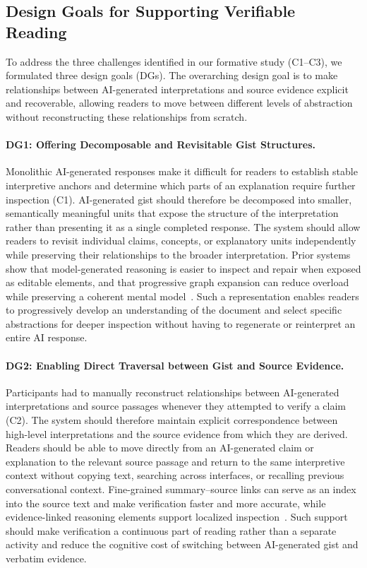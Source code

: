 \documentclass[manuscript,review,anonymous]{acmart}
\begin{document}
\subsection{Design Goals for Supporting Verifiable Reading}
\label{sec:formative-implications}

To address the three challenges identified in our formative study (C1--C3), we formulated three design goals (DGs). The overarching design goal is to make relationships between AI-generated interpretations and source evidence explicit and recoverable, allowing readers to move between different levels of abstraction without reconstructing these relationships from scratch.

\paragraph{\textbf{DG1: Offering Decomposable and Revisitable Gist Structures.}}
Monolithic AI-generated responses make it difficult for readers to establish stable interpretive anchors and determine which parts of an explanation require further inspection (C1). AI-generated gist should therefore be decomposed into smaller, semantically meaningful units that expose the structure of the interpretation rather than presenting it as a single completed response. The system should allow readers to revisit individual claims, concepts, or explanatory units independently while preserving their relationships to the broader interpretation. Prior systems show that model-generated reasoning is easier to inspect and repair when exposed as editable elements, and that progressive graph expansion can reduce overload while preserving a coherent mental model~\cite{criticality,mindtrellis}. Such a representation enables readers to progressively develop an understanding of the document and select specific abstractions for deeper inspection without having to regenerate or reinterpret an entire AI response.

\paragraph{\textbf{DG2: Enabling Direct Traversal between Gist and Source Evidence.}}
Participants had to manually reconstruct relationships between AI-generated interpretations and source passages whenever they attempted to verify a claim (C2). The system should therefore maintain explicit correspondence between high-level interpretations and the source evidence from which they are derived. Readers should be able to move directly from an AI-generated claim or explanation to the relevant source passage and return to the same interpretive context without copying text, searching across interfaces, or recalling previous conversational context. Fine-grained summary--source links can serve as an index into the source text and make verification faster and more accurate, while evidence-linked reasoning elements support localized inspection~\cite{kambhamettu2024traceabletextdeepeningreading,criticality}. Such support should make verification a continuous part of reading rather than a separate activity and reduce the cognitive cost of switching between AI-generated gist and verbatim evidence.
\end{document}
